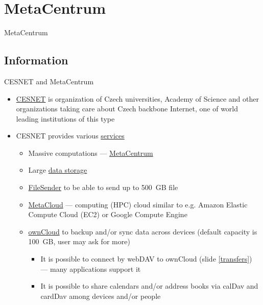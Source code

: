 \documentclass[compress, ucs, xelatex, 11pt, xcolor=svgnames,
  hyperref={
    bookmarks=true,
    unicode=true,
    colorlinks=true,
    pdftitle={Linux, command line and MetaCentrum},
    plainpages=false,
    pdfauthor={Vojtech Zeisek},
    pdfsubject={Course about use of Linux command line, writing shell scripts and using MetaCentrum of CESNET},
    pdfcreator={XeLaTeX},
    pdfkeywords={Linux, GNU, BASH, shell, command line, MetaCentrum},
    linkcolor=DarkRed,
    anchorcolor=DarkBlue,
    citecolor=Indigo,
    filecolor=NavyBlue,
    menucolor=DarkMagenta,
    urlcolor=DarkBlue,
    pdftex},
  url={hyphens, lowtilde} %
  ]{beamer}
\begin{document}
\section{MetaCentrum}

\begin{frame}{MetaCentrum}
  \tableofcontents[currentsection, sectionstyle=show/hide, hideothersubsections]
\end{frame}

\subsection{Information}

\begin{frame}[allowframebreaks]{CESNET and MetaCentrum}
  \label{CESNET}
  \begin{itemize}
    \item \href{https://www.cesnet.cz/?lang=en}{CESNET} is organization of Czech universities, Academy of Science and other organizations taking care about Czech backbone Internet, one of world leading institutions of this type
    \item CESNET provides various \href{https://www.cesnet.cz/services/?lang=en}{services}
    \begin{itemize}
      \item Massive computations --- \href{https://www.cesnet.cz/services/massive-computations-metacentrum/?lang=en}{MetaCentrum}
      \item Large \href{https://www.cesnet.cz/services/data-storage/?lang=en}{data storage}
      \item \href{https://www.cesnet.cz/services/filesender/?lang=en}{FileSender} to be able to send up to 500~GB file
      \item \href{https://www.metacentrum.cz/en/Sluzby/MetaCloud/}{MetaCloud} --- computing (HPC) cloud similar to e.g. Amazon Elastic Compute Cloud (EC2) or Google Compute Engine
      \item \href{https://www.cesnet.cz/services/owncloud/?lang=en}{ownCloud} to backup and/or sync data across devices (default capacity is 100~GB, user may ask for more)
      \begin{itemize}
	\item It is possible to connect by webDAV to ownCloud (slide \ref{transfers}) --- many applications support it
	\item It is possible to share calendars and/or address books via calDav and cardDav among devices and/or people
      \end{itemize}

\end{itemize}
\end{itemize}
\end{frame}
\end{document}
